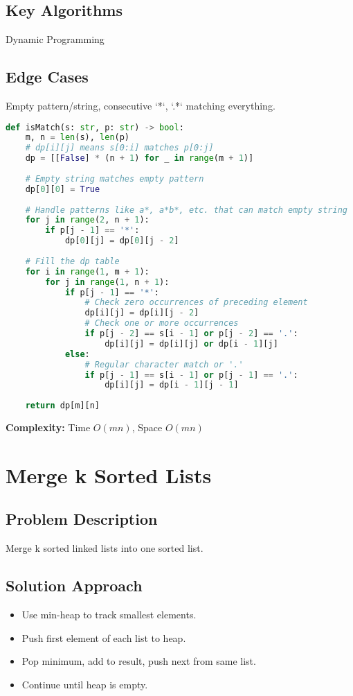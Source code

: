 \documentclass[10pt, a4paper]{article}
\begin{document}
\subsection*{Key Algorithms}
Dynamic Programming

\subsection*{Edge Cases}
Empty pattern/string, consecutive `*`, `.*` matching everything.

\begin{lstlisting}[language=Python]
def isMatch(s: str, p: str) -> bool:
    m, n = len(s), len(p)
    # dp[i][j] means s[0:i] matches p[0:j]
    dp = [[False] * (n + 1) for _ in range(m + 1)]
    
    # Empty string matches empty pattern
    dp[0][0] = True
    
    # Handle patterns like a*, a*b*, etc. that can match empty string
    for j in range(2, n + 1):
        if p[j - 1] == '*':
            dp[0][j] = dp[0][j - 2]
    
    # Fill the dp table
    for i in range(1, m + 1):
        for j in range(1, n + 1):
            if p[j - 1] == '*':
                # Check zero occurrences of preceding element
                dp[i][j] = dp[i][j - 2]
                # Check one or more occurrences
                if p[j - 2] == s[i - 1] or p[j - 2] == '.':
                    dp[i][j] = dp[i][j] or dp[i - 1][j]
            else:
                # Regular character match or '.'
                if p[j - 1] == s[i - 1] or p[j - 1] == '.':
                    dp[i][j] = dp[i - 1][j - 1]
    
    return dp[m][n]
\end{lstlisting}
\textbf{Complexity:} Time $O(mn)$, Space $O(mn)$

\section{Merge k Sorted Lists}
\subsection*{Problem Description}
Merge k sorted linked lists into one sorted list.

\subsection*{Solution Approach}
\begin{itemize}
    \item Use min-heap to track smallest elements.
    \item Push first element of each list to heap.
    \item Pop minimum, add to result, push next from same list.
    \item Continue until heap is empty.
\end{itemize}
\end{document}

